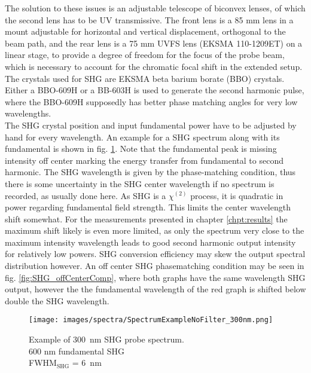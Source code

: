 \documentclass[twoside,openright,listof=numbered]{scrreprt}
\begin{document}
The solution to these issues is an adjustable telescope of biconvex lenses, of which the second lens has to be UV transmissive. The front lens is a 85 mm lens in a mount adjustable for horizontal and vertical displacement, orthogonal to the beam path, and the rear lens is a 75 mm UVFS lens (EKSMA 110-1209ET) on a linear stage, to provide a degree of freedom for the focus of the probe beam, which is necessary to account for the chromatic focal shift in the extended setup. The crystals used for SHG are EKSMA beta barium borate (BBO) crystals. Either a BBO-609H or a BB-603H is used to generate the second harmonic pulse, where the BBO-609H supposedly has better phase matching angles for very low wavelengths.\\
The SHG crystal position and input fundamental power have to be adjusted by hand for every wavelength. An example for a SHG spectrum along with its fundamental is shown in fig. \ref{fig:specSHG300nm}. Note that the fundamental peak is missing intensity off center marking the energy transfer from fundamental to second harmonic. The SHG wavelength is given by the phase-matching condition, thus there is some uncertainty in the SHG center wavelength if no spectrum is recorded, as usually done here. As SHG is a $\chi^{\left(2\right)}$ process, it is quadratic in power regarding fundamental field strength. This limits the center wavelength shift somewhat. For the measurements presented in chapter \ref{chpt:results} the maximum shift likely is even more limited, as only the spectrum very close to the maximum intensity wavelength leads to good second harmonic output intensity for relatively low powers. SHG conversion efficiency may skew the output spectral distribution however. An off center SHG phasematching condition may be seen in fig. \ref{fig:SHG_offCenterComp}, where both graphs have the same wavelength SHG output, however the the fundamental wavelength of the red graph is shifted below double the SHG wavelength. 
\begin{figure}[hbtp]
\centering
\texttt{[image: images/spectra/SpectrumExampleNoFilter\_300nm.png]}
\caption[Example of \qty{300}{\nano\meter} SHG probe spectrum.]{Example of \qty{300}{\nano\meter} SHG probe spectrum.\\600 nm fundamental SHG\label{fig:specSHG300nm}\\ FWHM$_\text{SHG}$ = \SI{6}{\nano\meter}}
\end{figure}
\end{document}

